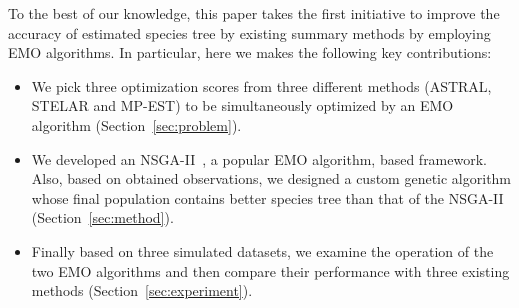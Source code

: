 To the best of our knowledge, this paper takes the first initiative to improve the accuracy of estimated species tree by existing summary methods by employing EMO algorithms.  In particular, here we makes the following key
contributions:

\begin{itemize}
	\item We pick three optimization scores from three different methods (ASTRAL, STELAR and MP-EST) to be simultaneously optimized by an EMO algorithm (Section~\ref{sec:problem}).  
	\item We developed an NSGA-II~\cite{deb2002fast}, a popular EMO algorithm, based  framework. Also, based on obtained observations, we designed a custom genetic algorithm whose final population contains better species tree than that of the NSGA-II (Section~\ref{sec:method}). 
	\item Finally based on three simulated datasets, we examine the operation of the two EMO algorithms and then compare their performance with three existing methods (Section~\ref{sec:experiment}). 
\end{itemize}


